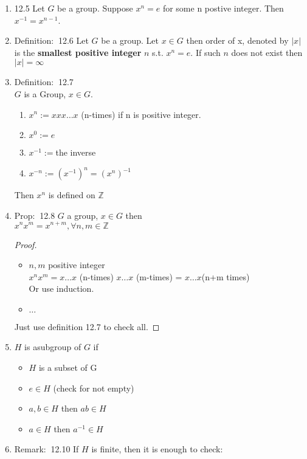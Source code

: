 \documentclass[12pt]{article}
\newcommand{\defi}{{\color{blue} Definition: $\ $}}
\newcommand{\prop}{{\color{blue} Prop: $\ $}}
\newcommand{\rem}{{\color{blue} Remark: $\ $}}
\begin{document}
\begin{enumerate}
\begin{enumerate}
        \item 12.5 Let $G$ be a group. Suppose $x^n=e$ for some n postive integer. Then $x^{-1} = x^{n-1}$.
        \item \defi 12.6 Let $G$ be a group. Let $x \in G$ then order of x, denoted by $|x|$ is the \textbf{smallest positive integer} $n$ s.t. $x^n=e$. If such $n$ does not exist then $|x| = \infty$
        \item \defi 12.7 \\
        $G$ is a Group, $x \in G$.
        \begin{enumerate}
            \item $x^n := xxx \dots x $ (n-times) if n is positive integer.
            \item $x^0 := e$
            \item $x^{-1}:=$the inverse
            \item $x^{-n} := (x^{-1})^n = (x^n)^{-1}$
        \end{enumerate}
        Then $x^{n}$ is defined on $\mathbb{Z}$
        \item \prop 12.8 $G$ a group, $x \in G$ then\\
        $x^nx^m = x^{n+m}, \forall n,m \in \mathbb{Z}$
        \begin{proof}
            \begin{itemize}
                \item $n,m$ positive integer\\
                $x^nx^m = x\dots x$ (n-times) $x\dots x$ (m-times) = $x\dots x$(n+m times)\\
                Or use induction.
                \item $\dots$
            \end{itemize}
            Just use definition 12.7 to check all.
        \end{proof}
        \item $H$ is asubgroup of $G$ if
        \begin{itemize}
            \item $H$ is a subset of G
            \item $e\in H$ (check for not empty)
            \item $a,b \in H$ then $ab \in H$
            \item $a\in H$ then $a^{-1} \in H$
        \end{itemize}
        \item \rem 12.10 If $H$ is finite, then it is enough to check:
        \begin{itemize}

\end{itemize}
\end{enumerate}
\end{enumerate}
\end{document}
